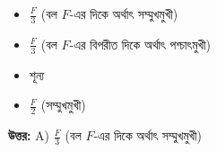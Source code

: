 \documentclass[12pt, a4paper]{article}
\begin{document}
\begin{itemize}[label={}, leftmargin=1cm, itemsep=0.5em]
    \item[\textbf{A)}]  $\frac{F}{3}$ (বল $F$-এর দিকে অর্থাৎ সম্মুখমুখী)
    \item[\textbf{B)}]  $\frac{F}{3}$ (বল $F$-এর বিপরীত দিকে অর্থাৎ পশ্চাৎমুখী)
    \item[\textbf{C)}]  শূন্য
    \item[\textbf{D)}]  $\frac{F}{2}$ (সম্মুখমুখী)
\end{itemize}

\vspace{0.5em}
\begin{tcolorbox}[answerbox]
    \textbf{\color{success} উত্তর:} A) $\frac{F}{3}$ (বল $F$-এর দিকে অর্থাৎ সম্মুখমুখী)
\end{tcolorbox}
\vspace{1em}
\end{document}
